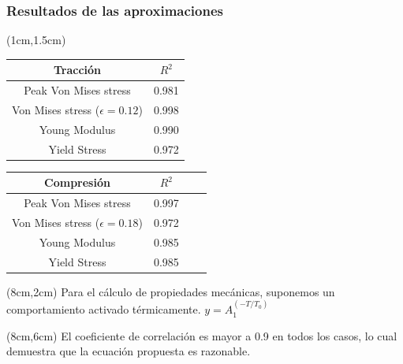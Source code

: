 \documentclass[12pt,t]{beamer}
\begin{document}
\begin{frame}
 \frametitle{Resultados de las aproximaciones}
 \begin{textblock*}{6cm}(1cm,1.5cm) 
    
    \begin{table}[htp]
    \begin{center}
    \begin{tabular}{c c}
    \hline
    \textbf{Tracci\'on} & $R^{2}$ \\ \hline \hline
    Peak Von Mises stress &  0.981 \\ \hline
    Von Mises stress ($\epsilon=0.12$) & 0.998 \\ \hline
    Young Modulus & 0.990 \\ \hline
    Yield Stress &  0.972 \\ \hline
    \end{tabular}
    \end{center}
    \end{table}

    \begin{table}[htp]
    \begin{center}
    \begin{tabular}{*{4}{c}}
    \hline
    \textbf{Compresi\'on} & $R^{2}$ \\ \hline \hline
    Peak Von Mises stress & 0.997 \\ \hline
    Von Mises stress ($\epsilon=0.18$) & 0.972 \\ \hline
    Young Modulus & 0.985 \\ \hline
    Yield Stress & 0.985 \\ \hline
    \end{tabular}
    \end{center}
    \end{table}
 \end{textblock*}
  \begin{textblock*}{4.7cm}(8cm,2cm)
  \centering
   Para el c\'alculo de propiedades mec\'anicas, suponemos un comportamiento activado t\'ermicamente.
    $y=A_1^{(-T/T_0)}$
  \end{textblock*}
  \begin{textblock*}{4.7cm}(8cm,6cm)
  \centering
   El coeficiente de correlaci\'on es mayor a 0.9 en todos los casos, lo cual demuestra que la ecuaci\'on propuesta es razonable.
  \end{textblock*}
\end{frame}
\end{document}
